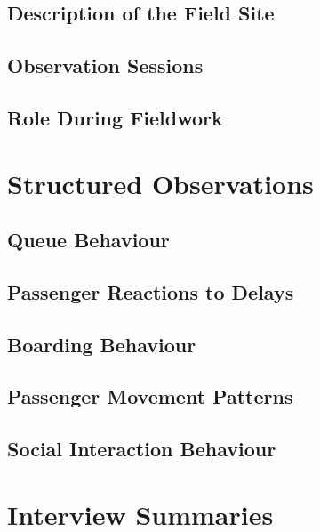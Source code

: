 \documentclass[12pt,a4paper]{report}
\begin{document}
\section{Description of the Field Site}

\section{Observation Sessions}

\section{Role During Fieldwork}


\chapter{Structured Observations}

\section{Queue Behaviour}

\section{Passenger Reactions to Delays}

\section{Boarding Behaviour}

\section{Passenger Movement Patterns}

\section{Social Interaction Behaviour}


\chapter{Interview Summaries}
\end{document}
